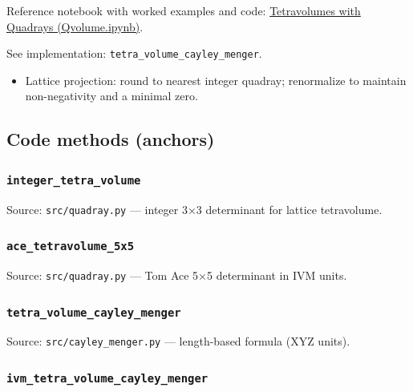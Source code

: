 \documentclass[
  10pt,
]{article}
\providecommand{\tightlist}{%
  \setlength{\itemsep}{0pt}\setlength{\parskip}{0pt}}
\begin{document}
Reference notebook with worked examples and code:
\href{https://github.com/4dsolutions/School_of_Tomorrow/blob/master/Qvolume.ipynb}{Tetravolumes
with Quadrays (Qvolume.ipynb)}.

See implementation: \texttt{tetra\_volume\_cayley\_menger}.

\begin{itemize}
\tightlist
\item
  Lattice projection: round to nearest integer quadray; renormalize to
  maintain non-negativity and a minimal zero.
\end{itemize}

\hypertarget{code-methods-anchors}{%
\subsection{Code methods (anchors)}\label{code-methods-anchors}}

\hypertarget{code:integer_tetra_volume}{%
\subsubsection{\texorpdfstring{\texttt{integer\_tetra\_volume}}{integer\_tetra\_volume}}\label{code:integer_tetra_volume}}

Source: \texttt{src/quadray.py} --- integer 3×3 determinant for lattice
tetravolume.

\hypertarget{code:ace_tetravolume_5x5}{%
\subsubsection{\texorpdfstring{\texttt{ace\_tetravolume\_5x5}}{ace\_tetravolume\_5x5}}\label{code:ace_tetravolume_5x5}}

Source: \texttt{src/quadray.py} --- Tom Ace 5×5 determinant in IVM
units.

\hypertarget{code:tetra_volume_cayley_menger}{%
\subsubsection{\texorpdfstring{\texttt{tetra\_volume\_cayley\_menger}}{tetra\_volume\_cayley\_menger}}\label{code:tetra_volume_cayley_menger}}

Source: \texttt{src/cayley\_menger.py} --- length-based formula (XYZ
units).

\hypertarget{code:ivm_tetra_volume_cayley_menger}{%
\subsubsection{\texorpdfstring{\texttt{ivm\_tetra\_volume\_cayley\_menger}}{ivm\_tetra\_volume\_cayley\_menger}}\label{code:ivm_tetra_volume_cayley_menger}}
\end{document}
